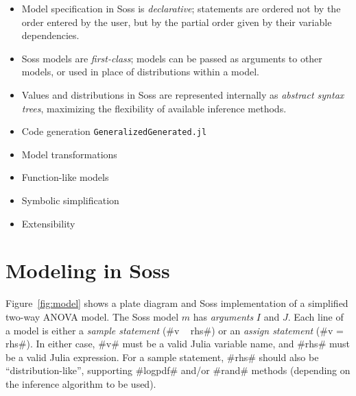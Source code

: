 \documentclass[anonymous=false, %
               format=acmsmall, %
               review=true, %
               screen=true, %
               nonacm=true]{acmart}
\begin{document}
\begin{itemize}
    \item Model specification in Soss is \emph{declarative}; statements are ordered not by the order entered by the user, but by the partial order given by their variable dependencies.
    \item Soss models are \emph{first-class}; models can be passed as arguments to other models, or used in place of distributions within a model.
    \item Values and distributions in Soss are represented internally as \emph{abstract syntax trees}, maximizing the flexibility of available inference methods.
    \item Code generation \texttt{GeneralizedGenerated.jl}
    \item Model transformations
    \item Function-like models
    \item Symbolic simplification
    \item Extensibility
\end{itemize}

\section{Modeling in Soss}

Figure~\ref{fig:model} shows a plate diagram and Soss implementation of a simplified two-way ANOVA model. The Soss model $m$ has \emph{arguments} $I$ and $J$. Each line of a model is either a \emph{sample statement} (\jl#v ~ rhs#) or an \emph{assign statement} (\jl#v = rhs#). In either case, \jl#v# must be a valid Julia variable name, and \jl#rhs# must be a valid Julia expression. For a sample statement, \jl#rhs# should also be ``distribution-like'', supporting \jl#logpdf# and/or \jl#rand# methods (depending on the inference algorithm to be used).
\end{document}
